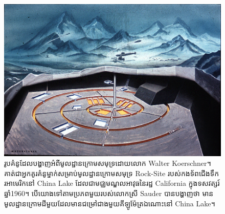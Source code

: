 \documentclass[10pt,twocolumn,letterpaper]{article}
\begin{document}
\begin{figure}[t]
\begin{center}
   \includegraphics[width=1\linewidth]{undersea.jpg}
\end{center}
   \caption{រូបគំនូដែលបង្ហាញអំពីមូលដ្ឋានក្រោមសមុទ្រដោយលោក Walter Koerschner។ គាត់ជាអ្នកគូរគំនូម្នាក់សម្រាប់មូលដ្ឋានក្រោមសមុទ្រ Rock-Site របស់កងទ័ពជើងទឹករអាមេរិកនៅ China Lake ដែលជាមជ្ឈមណ្ឌលអាវុធនៃរដ្ឋ California ក្នុងទសវត្សរ៍ឆ្នាំ1960។ បើយោងទៅតាមប្រភពមួយរបស់លោកស្រី Sauder បានបង្ហាញថា មានមូលដ្ឋានក្រោមដីមួយដែលមានជម្រៅជាងមួយគីឡូម៉ែត្រឯណោះនៅ China Lake\cite{22,23}។}
\label{fig:5}
\label{fig:onecol}
\end{figure}
\end{document}
